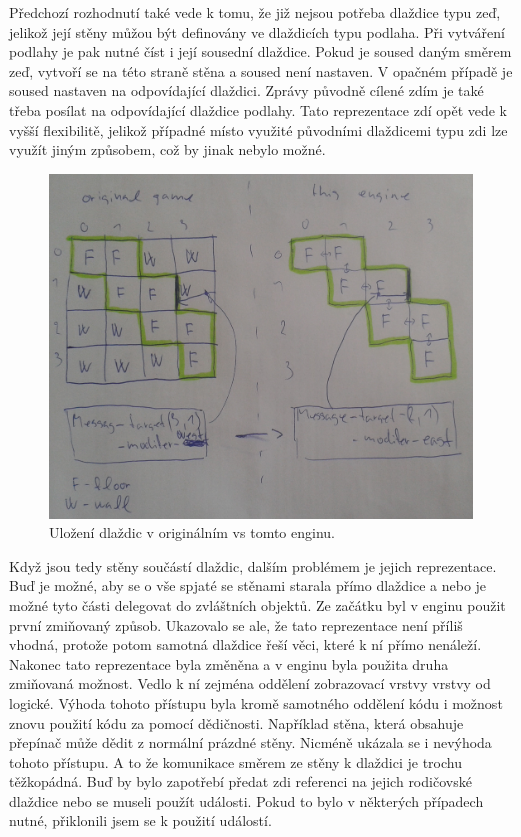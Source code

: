 Předchozí rozhodnutí také vede k tomu, že již nejsou potřeba dlaždice typu zeď, jelikož její stěny můžou být definovány ve 
dlaždicích typu podlaha. Při vytváření podlahy je pak nutné číst i její sousední dlaždice. Pokud je soused daným směrem zeď, 
vytvoří se na této straně stěna a soused není nastaven. V opačném případě je soused nastaven na odpovídající dlaždici.
Zprávy původně cílené zdím je také třeba posílat na odpovídající dlaždice podlahy. Tato reprezentace zdí opět vede k
vyšší flexibilitě, jelikož případné místo využité původními dlaždicemi typu zdi lze využít jiným způsobem, což by jinak nebylo možné.

\begin{figure}[H]\centering
\includegraphics[width=\textwidth]{./img/tile-representation.png}
\caption{Uložení dlaždic v originálním vs tomto enginu.}
\label{tile-representation-img}
\end{figure}

Když jsou tedy stěny součástí dlaždic, dalším problémem je jejich reprezentace. Buď je možné, aby se o vše spjaté se stěnami starala přímo
dlaždice a nebo je možné tyto části delegovat do zvláštních objektů. Ze začátku byl v enginu použit první zmiňovaný způsob. Ukazovalo se ale, 
že tato reprezentace není příliš vhodná, protože potom samotná dlaždice řeší věci, které k ní přímo nenáleží.
Nakonec tato reprezentace byla změněna a v enginu byla použita druha zmiňovaná možnost. Vedlo k ní zejména oddělení zobrazovací vrstvy 
vrstvy od logické. Výhoda tohoto přístupu byla kromě samotného oddělení kódu i možnost znovu použití kódu za pomocí dědičnosti. 
Například stěna, která obsahuje přepínač může dědit z normální prázdné stěny. Nicméně ukázala se i nevýhoda tohoto přístupu. A to že komunikace směrem 
ze stěny k dlaždici je trochu těžkopádná. Buď by bylo zapotřebí předat zdi referenci na jejich rodičovské dlaždice nebo se museli použít události.
Pokud to bylo v některých případech nutné, přiklonili jsem se k použití událostí.

